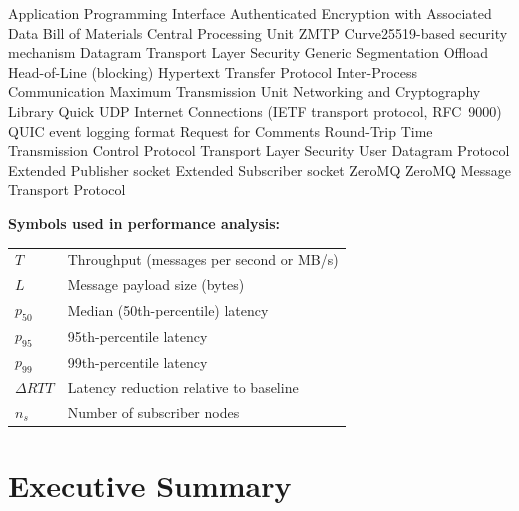 \documentclass[12pt, a4paper, oneside]{report}
\begin{document}
\begin{acronym}[QUICMQ]
     {Application Programming Interface}
    {Authenticated Encryption with Associated Data}
     {Bill of Materials}
     {Central Processing Unit}
   {ZMTP Curve25519-based security mechanism}
    {Datagram Transport Layer Security}
     {Generic Segmentation Offload}
     {Head-of-Line (blocking)}
    {Hypertext Transfer Protocol}
     {Inter-Process Communication}
     {Maximum Transmission Unit}
    {Networking and Cryptography Library}
    {Quick UDP Internet Connections (IETF transport protocol, RFC~9000)}
    {QUIC event logging format}
     {Request for Comments}
     {Round-Trip Time}
     {Transmission Control Protocol}
     {Transport Layer Security}
     {User Datagram Protocol}
    {Extended Publisher socket}
    {Extended Subscriber socket}
     {ZeroMQ}
    {ZeroMQ Message Transport Protocol}
\end{acronym}

\vspace{1em}
\noindent\textbf{Symbols used in performance analysis:}

\begin{tabular}{ll}
  $T$      & Throughput (messages per second or MB/s) \\
  $L$      & Message payload size (bytes) \\
  $p_{50}$ & Median (50th-percentile) latency \\
  $p_{95}$ & 95th-percentile latency \\
  $p_{99}$ & 99th-percentile latency \\
  $\Delta RTT$ & Latency reduction relative to baseline \\
  $n_s$    & Number of subscriber nodes \\
\end{tabular}

\cleardoublepage
{}
\pagestyle{fancy}

\chapter{Executive Summary}
\label{ch:exec}
\end{document}
